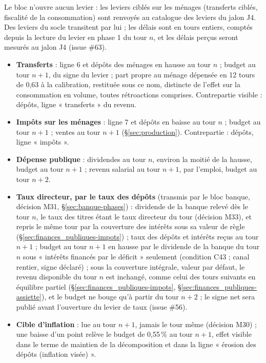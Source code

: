 \documentclass[11pt,a4paper]{article}
\begin{document}
\begin{joueur}[ménages]
Le bloc n'ouvre aucun levier : les leviers ciblés sur les ménages (transferts ciblés, fiscalité de la consommation) sont renvoyés au catalogue des leviers du jalon J4. Des leviers du socle transitent par lui ; les délais sont en tours entiers, comptés depuis la lecture du levier en phase 1 du tour $n$, et les délais perçus seront mesurés au jalon J4 (issue \#63).
\begin{itemize}
\item \textbf{Transferts} : ligne 6 et dépôts des ménages en hausse au tour $n$ ; budget au tour $n + 1$, du signe du levier ; part propre au ménage dépensée en 12 tours de 0,63 à la calibration, restituée sous ce nom, distincte de l'effet sur la consommation en volume, toutes rétroactions comprises. Contrepartie visible : dépôts, ligne « transferts » du revenu.
\item \textbf{Impôts sur les ménages} : ligne 7 et dépôts en baisse au tour $n$ ; budget au tour $n + 1$ ; ventes au tour $n + 1$ (\S\ref{sec:production}). Contrepartie : dépôts, ligne « impôts ».
\item \textbf{Dépense publique} : dividendes au tour $n$, environ la moitié de la hausse, budget au tour $n + 1$ ; revenu salarial au tour $n + 1$, par l'emploi, budget au tour $n + 2$.
\item \textbf{Taux directeur, par le taux des dépôts} (transmis par le bloc banque, décision M31, \S\ref{sec:banque-phases}) : dividende de la banque relevé dès le tour $n$, le taux des titres étant le taux directeur du tour (décision M33), et repris le même tour par la couverture des intérêts sous sa valeur de règle (\S\ref{sec:finances_publiques-impots}) ; taux des dépôts et intérêts reçus au tour $n + 1$ ; budget au tour $n + 1$ en hausse par le dividende de la banque du tour $n$ sous « intérêts financés par le déficit » seulement (condition C43 ; canal rentier, signe déclaré) ; sous la couverture intégrale, valeur par défaut, le revenu disponible du tour $n$ est inchangé, comme celui des tours suivants en équilibre partiel (\S\ref{sec:finances_publiques-impots}, \S\ref{sec:finances_publiques-assiette}), et le budget ne bouge qu'à partir du tour $n + 2$ ; le signe net sera publié avant l'ouverture du levier de taux (issue \#56).
\item \textbf{Cible d'inflation} : lue au tour $n + 1$, jamais le tour même (décision M30) ; une baisse d'un point relève le budget de 0,55\,\% au tour $n + 1$, effet visible dans le terme de maintien de la décomposition et dans la ligne « érosion des dépôts (inflation visée) ».
\end{itemize}
\end{joueur}
\end{document}
